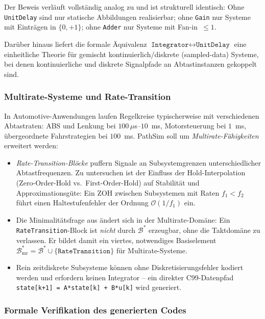 ﻿\documentclass[12pt,a4paper]{article}
\theoremstyle{definition}
\begin{document}
Der Beweis verläuft vollständig analog zu  und ist
strukturell identisch: Ohne \texttt{UnitDelay} sind nur statische
Abbildungen realisierbar; ohne \texttt{Gain} nur Systeme mit Einträgen in
$\{0,+1\}$; ohne \texttt{Adder} nur Systeme mit Fan-in~$\leq 1$.

Darüber hinaus liefert die formale Äquivalenz $\texttt{Integrator}
\leftrightarrow \texttt{UnitDelay}$ eine einheitliche Theorie für
gemischt kontinuierlich/diskrete (sampled-data) Systeme, bei denen
kontinuierliche und diskrete Signalpfade an Abtastinstanzen gekoppelt sind.

\subsubsection{Multirate-Systeme und Rate-Transition}

In Automotive-Anwendungen laufen Regelkreise typischerweise mit
verschiedenen Abtastraten: ABS und Lenkung bei $100\,\mu$s--$10$~ms,
Motorsteuerung bei $1$~ms, übergeordnete Fahrstrategien bei $100$~ms.
PathSim soll um \emph{Multirate-Fähigkeiten} erweitert werden:

\begin{itemize}
  \item \emph{Rate-Transition-Blöcke} puffern Signale an Subsystemgrenzen
        unterschiedlicher Abtastfrequenzen. Zu untersuchen ist der Einfluss
        der Hold-Interpolation (Zero-Order-Hold vs.\ First-Order-Hold) auf
        Stabilität und Approximationsgüte: Ein ZOH zwischen Subsystemen mit
        Raten $f_1 < f_2$ führt einen Haltestufenfehler der Ordnung
        $\mathcal{O}(1/f_1)$ ein.
  \item Die Minimalitätsfrage aus  ändert sich in der
        Multirate-Domäne: Ein \texttt{RateTransition}-Block ist
        \emph{nicht} durch $\mathcal{B}^*$ erzeugbar, ohne die
        Taktdomäne zu verlassen. Er bildet damit ein viertes, notwendiges
        Basiselement $\mathcal{B}^*_{\mathrm{mr}} = \mathcal{B}^* \cup
        \{\texttt{RateTransition}\}$ für Multirate-Systeme.
  \item Rein zeitdiskrete Subsysteme können ohne Diskretisierungsfehler
        kodiert werden und erfordern keinen Integrator -- ein direkter
        C99-Datenpfad \texttt{state[k+1] = A*state[k] + B*u[k]} wird generiert.
\end{itemize}

\subsubsection{Formale Verifikation des generierten Codes}
\end{document}
